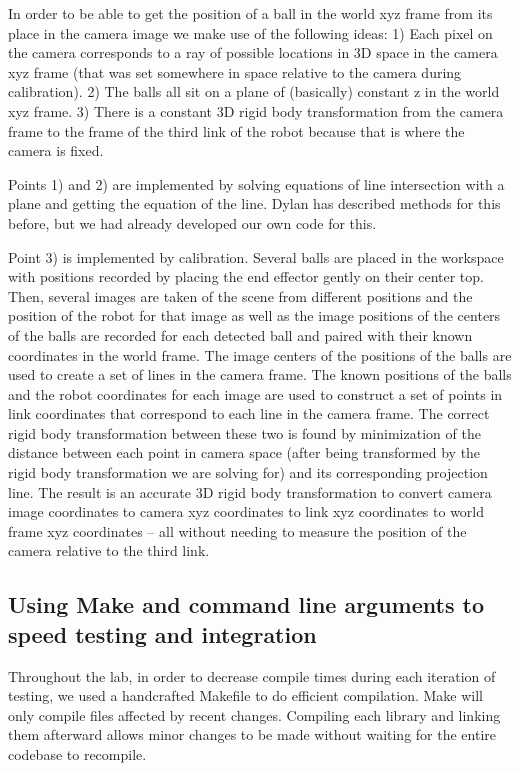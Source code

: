 \documentclass{article}
\begin{document}
In order to be able to get the position of a ball in the world xyz frame from its place in the camera image we make use of the following ideas: 1) Each pixel on the camera corresponds to a ray of possible locations in 3D space in the camera xyz frame (that was set somewhere in space relative to the camera during calibration). 2) The balls all sit on a plane of (basically) constant z in the world xyz frame. 3) There is a constant 3D rigid body transformation from the camera frame to the frame of the third link of the robot because that is where the camera is fixed.

Points 1) and 2) are implemented by solving equations of line intersection with a plane and getting the equation of the line. Dylan has described methods for this before, but we had already developed our own code for this. 

Point 3) is implemented by calibration. Several balls are placed in the workspace with positions recorded by placing the end effector gently on their center top. Then, several images are taken of the scene from different positions and the position of the robot for that image as well as the image positions of the centers of the balls are recorded for each detected ball and paired with their known coordinates in the world frame. The image centers of the positions of the balls are used to create a set of lines in the camera frame. The known positions of the balls and the robot coordinates for each image are used to construct a set of points in link coordinates that correspond to each line in the camera frame. The correct rigid body transformation between these two is found by minimization of the distance between each point in camera space (after being transformed by the rigid body transformation we are solving for) and its corresponding projection line. The result is an accurate 3D rigid body transformation to convert camera image coordinates to camera xyz coordinates to link xyz coordinates to world frame xyz coordinates -- all without needing to measure the position of the camera relative to the third link.

\subsection{Using Make and command line arguments to speed testing and integration}
Throughout the lab, in order to decrease compile times during each iteration of testing, we used a handcrafted Makefile to do efficient compilation. Make will only compile files affected by recent changes. Compiling each library and linking them afterward allows minor changes to be made without waiting for the entire codebase to recompile.
\end{document}
